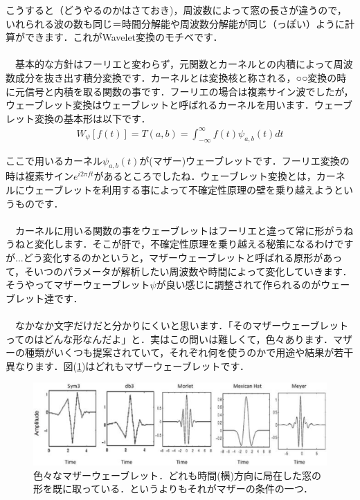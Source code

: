 \documentclass[11pt,a4paper]{ujreport} 	%
\begin{document}
こうすると（どうやるのかはさておき)，周波数によって窓の長さが違うので，いれられる波の数も同じ＝時間分解能や周波数分解能が同じ（っぽい）ように計算ができます．これがWavelet変換のモチベです．\\
\\
　基本的な方針はフーリエと変わらず，元関数とカーネルとの内積によって周波数成分を抜き出す積分変換です．カーネルとは変換核と称される，○○変換の時に元信号と内積を取る関数の事です．フーリエの場合は複素サイン波でしたが，ウェーブレット変換はウェーブレットと呼ばれるカーネルを用います．ウェーブレット変換の基本形は以下です．\\

\begin{eqnarray}
W_\psi[f(t)]  = T(a,b) = \int_{-\infty}^{\infty} f(t)\psi_{a,b}(t) dt
\label{eq:wavelet_transform}
\end{eqnarray}

ここで用いるカーネル$\psi_{a,b}(t)$が(マザー)ウェーブレットです．フーリエ変換の時は複素サイン$e^{i2\pi ft}$があるところでしたね．ウェーブレット変換とは，カーネルにウェーブレットを利用する事によって不確定性原理の壁を乗り越えようというものです．\\
\\
　カーネルに用いる関数の事をウェーブレットはフーリエと違って常に形がうねうねと変化します．そこが肝で，不確定性原理を乗り越える秘策になるわけですが...どう変化するのかというと，マザーウェーブレットと呼ばれる原形があって，そいつのパラメータが解析したい周波数や時間によって変化していきます．そうやってマザーウェーブレット$\psi$が良い感じに調整されて作られるのがウェーブレット達です．\\
\\
　なかなか文字だけだと分かりにくいと思います．「そのマザーウェーブレットってのはどんな形なんだよ」と．実はこの問いは難しくて，色々あります．マザーの種類がいくつも提案されていて，それぞれ何を使うのかで用途や結果が若干異なります．図(\ref{im:wavelets})はどれもマザーウェーブレットです．

\begin{figure}[H]
  \label{im:wavelets}
  \centering
  \includegraphics[width=12cm]{../figures/wavelets.eps}
  \caption{色々なマザーウェーブレット．どれも時間(横)方向に局在した窓の形を既に取っている．というよりもそれがマザーの条件の一つ．}
\end{figure}
\end{document}
